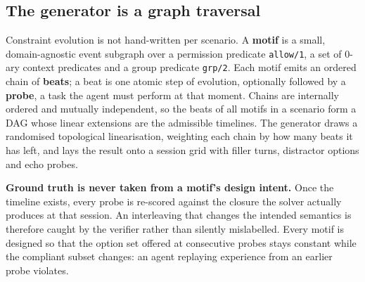 \documentclass{article} %
\newcommand{\pred}[1]{\texttt{#1}}
\begin{document}
\subsection{The generator is a graph traversal}
Constraint evolution is not hand-written per scenario. A \textbf{motif} is a small, domain-agnostic event subgraph over a permission predicate \pred{allow/1}, a set of 0-ary context predicates and a group predicate \pred{grp/2}. Each motif emits an ordered chain of \textbf{beats}; a beat is one atomic step of evolution, optionally followed by a \textbf{probe}, a task the agent must perform at that moment. Chains are internally ordered and mutually independent, so the beats of all motifs in a scenario form a DAG whose linear extensions are the admissible timelines. The generator draws a randomised topological linearisation, weighting each chain by how many beats it has left, and lays the result onto a session grid with filler turns, distractor options and echo probes.

\textbf{Ground truth is never taken from a motif's design intent.} Once the timeline exists, every probe is re-scored against the closure the solver actually produces at that session. An interleaving that changes the intended semantics is therefore caught by the verifier rather than silently mislabelled. Every motif is designed so that the option set offered at consecutive probes stays constant while the compliant subset changes: an agent replaying experience from an earlier probe violates.
\end{document}
